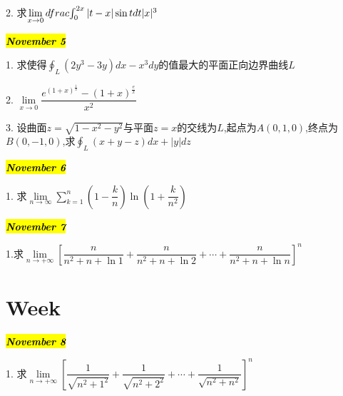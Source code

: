 2. 求$\lim\limits_{x\rightarrow 0}\\dfrac{\int_{0}^{2x}|t-x|\sin tdt}{|x|^{3}}$
\begin{solution}
	
\end{solution}
\hl{\textbf{\textit{November 5}}}

1. 求使得$\oint_{L}(2y^{3}-3y)dx-x^{3}dy$的值最大的平面正向边界曲线$L$
\begin{solution}
	
\end{solution}
2. $\lim\limits_{x\rightarrow 0}\dfrac{e^{(1+x)^{\frac{1}{x}}}-(1+x)^{\frac{e}{x}}}{x^{2}}$
\begin{solution}
	
\end{solution}
3. 设曲面$z=\sqrt{1-x^{2}-y^{2}}$与平面$z=x$的交线为$L$,起点为$A(0,1,0)$,终点为$B(0,-1,0)$,求$\oint_{L}(x+y-z)dx+|y|dz$
\begin{solution}
	
\end{solution}

\hl{\textbf{\textit{November 6}}}

1. 求$\lim\limits_{n\rightarrow \infty}\sum\limits_{k=1}^{n}\left(1-\dfrac{k}{n}\right)\ln(1+\dfrac{k}{n^{2}})$
\begin{solution}
	
\end{solution}


\hl{\textbf{\textit{November 7}}}

1.求$\lim\limits_{n\rightarrow +\infty}\left[\dfrac{n}{n^{2}+n+\ln1}+\dfrac{n}{n^{2}+n+\ln2}+\cdots+\dfrac{n}{n^{2}+n+\ln n} \right]^{n}$
\begin{solution}
	
\end{solution}

\section{Week }
\hl{\textbf{\textit{November 8}}}

1. 求$\lim\limits_{n\rightarrow +\infty}\left[ \dfrac{1}{\sqrt{n^{2}+1^{2}}}+\dfrac{1}{\sqrt{n^{2}+2^{2}}}+\cdots+\dfrac{1}{\sqrt{n^{2}+n^{2}}}\right]^{n}$
\begin{solution}
	
\end{solution}

